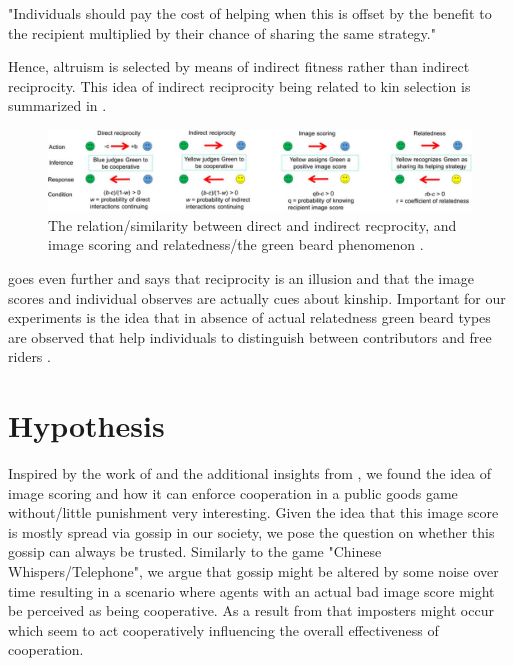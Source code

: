 \documentclass[sigconf]{acmart}
\begin{document}
    "Individuals should pay the cost of helping when this is offset by the benefit to the recipient multiplied by their chance of sharing the same strategy." \cite{roberts_kin_2019}

    Hence, altruism is selected by means of indirect fitness rather than indirect reciprocity.
    This idea of indirect reciprocity being related to kin selection is summarized in .

    \begin{figure}
        \includegraphics[width=\textwidth]{figures/indirect_reciprocity}
        \caption{The relation/similarity between direct and indirect recprocity, and image scoring and relatedness/the green beard phenomenon \cite{roberts_kin_2019}.}
        \label{fig:indirect_reciprocity}
    \end{figure}

    \citeauthor{roberts_kin_2019} goes even further and says that reciprocity is an illusion and that the image scores and individual observes are actually cues about kinship.
    Important for our experiments is the idea that in absence of actual relatedness green beard types are observed that help individuals to distinguish between contributors and free riders \cite{roberts_kin_2019}.


    \section{Hypothesis}
    Inspired by the work of \citeauthor{milinski_cooperation_2002} \cite{milinski_cooperation_2002} and the additional insights from \citeauthor{roberts_kin_2019} \cite{roberts_kin_2019}, we found the idea of image scoring and how it can enforce cooperation in a public goods game without/little punishment very interesting.
    Given the idea that this image score is mostly spread via gossip in our society, we pose the question on whether this gossip can always be trusted.
    Similarly to the game "Chinese Whispers/Telephone", we argue that gossip might be altered by some noise over time resulting in a scenario where agents with an actual bad image score might be perceived as being cooperative.
    As a result from that imposters might occur which seem to act cooperatively influencing the overall effectiveness of cooperation.
\end{document}
